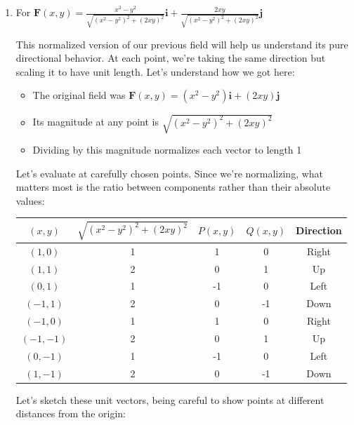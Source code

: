 \begin{example}
\begin{solution}
\begin{enumerate}
\item For $\mathbf{F}(x,y) = \frac{x^2-y^2}{\sqrt{(x^2-y^2)^2 + (2xy)^2}}\mathbf{i} + \frac{2xy}{\sqrt{(x^2-y^2)^2 + (2xy)^2}}\mathbf{j}$

This normalized version of our previous field will help us understand its pure directional behavior. At each point, we're taking the same direction but scaling it to have unit length. Let's understand how we got here:

\begin{itemize}
   \item The original field was $\mathbf{F}(x,y) = (x^2-y^2)\mathbf{i} + (2xy)\mathbf{j}$
   \item Its magnitude at any point is $\sqrt{(x^2-y^2)^2 + (2xy)^2}$
   \item Dividing by this magnitude normalizes each vector to length 1
\end{itemize}

Let's evaluate at carefully chosen points. Since we're normalizing, what matters most is the ratio between components rather than their absolute values:

\begin{center}
\begin{tabular}{|c|c||c|c|c|}
\hline
$(x,y)$ & $\sqrt{(x^2-y^2)^2 + (2xy)^2}$ & $P(x,y)$ & $Q(x,y)$ & Direction \\
\hline
$(1,0)$ & 1 & 1 & 0 & Right \\
$(1,1)$ & 2 & 0 & 1 & Up \\
$(0,1)$ & 1 & -1 & 0 & Left \\
$(-1,1)$ & 2 & 0 & -1 & Down \\
$(-1,0)$ & 1 & 1 & 0 & Right \\
$(-1,-1)$ & 2 & 0 & 1 & Up \\
$(0,-1)$ & 1 & -1 & 0 & Left \\
$(1,-1)$ & 2 & 0 & -1 & Down \\
\hline
\end{tabular}
\end{center}

Let's sketch these unit vectors, being careful to show points at different distances from the origin:

\begin{center}
\end{center}
\end{enumerate}
\end{solution}
\end{example}
